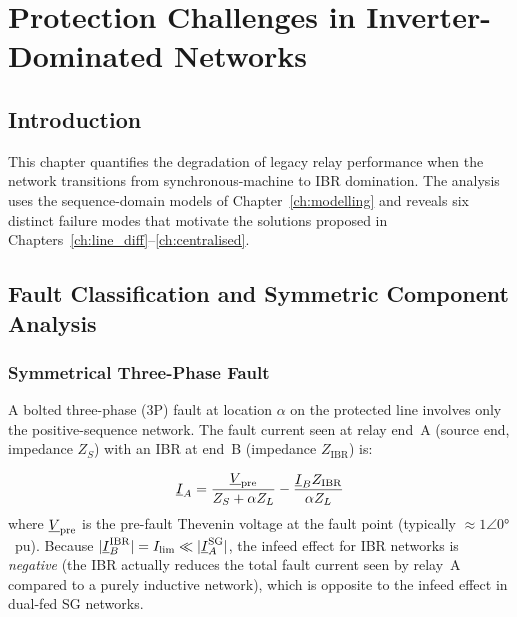 \chapter{Protection Challenges in Inverter-Dominated Networks}
\label{ch:challenges}

\section{Introduction}

This chapter quantifies the degradation of legacy relay performance when
the network transitions from synchronous-machine to IBR domination.
The analysis uses the sequence-domain models of Chapter~\ref{ch:modelling}
and reveals six distinct failure modes that motivate the solutions proposed
in Chapters~\ref{ch:line_diff}--\ref{ch:centralised}.

\section{Fault Classification and Symmetric Component Analysis}
\label{sec:ch3_faults}

\subsection{Symmetrical Three-Phase Fault}

A bolted three-phase (3P) fault at location $\alpha$ on the protected line
involves only the positive-sequence network. The fault current seen at
relay end~A (source end, impedance $Z_S$) with an IBR at end~B
(impedance $Z_\mathrm{IBR}$) is:

\begin{equation}
  \underline{I}_A = \frac{\underline{V}_\mathrm{pre}}{Z_S + \alpha Z_L}
    - \frac{\underline{I}_B Z_\mathrm{IBR}}{\alpha Z_L}
  \label{eq:ch3_3p_ia}
\end{equation}
where $\underline{V}_\mathrm{pre}$ is the pre-fault Thevenin voltage at the
fault point (typically $\approx 1\angle 0°$~pu). Because
$|\underline{I}_B^\mathrm{IBR}| = I_\mathrm{lim} \ll |\underline{I}_A^\mathrm{SG}|$,
the infeed effect for IBR networks is \emph{negative} (the IBR actually
reduces the total fault current seen by relay~A compared to a purely
inductive network), which is opposite to the infeed effect in dual-fed SG
networks.

